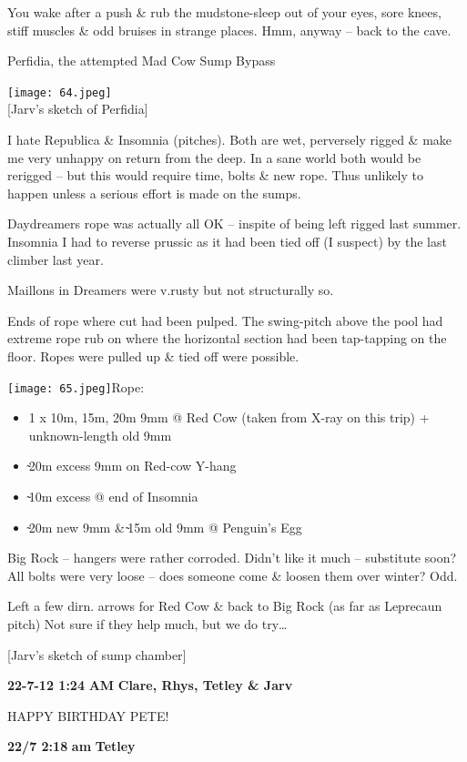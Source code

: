 You wake after a push \& rub the mudstone-sleep out of your eyes, sore
knees, stiff muscles \& odd bruises in strange places. Hmm, anyway --
back to the cave.

Perfidia, the attempted Mad Cow Sump Bypass

\texttt{[image: 64.jpeg]}\\
{[}Jarv's sketch of Perfidia{]}

I hate Republica \& Insomnia (pitches). Both are wet, perversely rigged
\& make me very unhappy on return from the deep. In a sane world both
would be rerigged -- but this would require time, bolts \& new rope.
Thus unlikely to happen unless a serious effort is made on the sumps.

Daydreamers rope was actually all OK -- inspite of being left rigged
last summer. Insomnia I had to reverse prussic as it had been tied off
(I suspect) by the last climber last year.

Maillons in Dreamers were v.rusty but not structurally so.

Ends of rope where cut had been pulped. The swing-pitch above the pool
had extreme rope rub on where the horizontal section had been
tap-tapping on the floor. Ropes were pulled up \& tied off were
possible.

\texttt{[image: 65.jpeg]}Rope:

\begin{itemize}
\tightlist
\item
  1 x 10m, 15m, 20m 9mm @ Red Cow (taken from X-ray on this trip) +
  unknown-length old 9mm
\item
  ̴20m excess 9mm on Red-cow Y-hang
\item
  ̴10m excess @ end of Insomnia
\item
  ̴20m new 9mm \& ̴15m old 9mm @ Penguin's Egg
\end{itemize}

Big Rock -- hangers were rather corroded. Didn't like it much --
substitute soon? All bolts were very loose -- does someone come \&
loosen them over winter? Odd.

Left a few dirn. arrows for Red Cow \& back to Big Rock (as far as
Leprecaun pitch) Not sure if they help much, but we do try\ldots{}

{[}Jarv's sketch of sump chamber{]}

\textbf{22-7-12 1:24} \textbf{AM} \textbf{Clare, Rhys, Tetley \& Jarv}

HAPPY BIRTHDAY PETE!

\textbf{22/7 2:18} \textbf{am} \textbf{Tetley}


